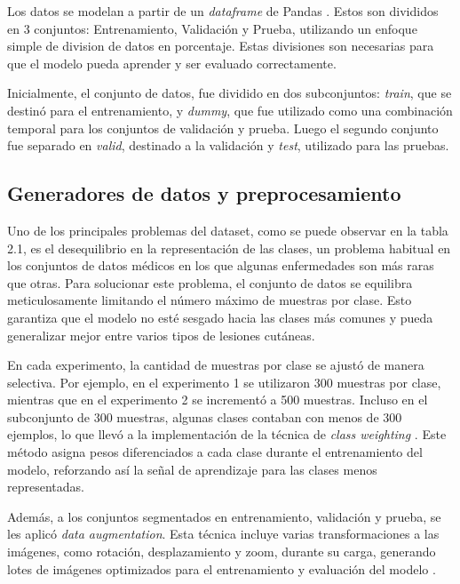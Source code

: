 Los datos se modelan a partir de un \textit{dataframe} de Pandas . Estos son divididos en 3 conjuntos: Entrenamiento, Validación y Prueba, utilizando un enfoque simple de division de datos en porcentaje. Estas divisiones son necesarias para que el modelo pueda aprender y ser evaluado correctamente.

Inicialmente, el conjunto de datos, fue dividido en dos subconjuntos: \textit{train}, que se destinó para el entrenamiento, y \textit{dummy}, que fue utilizado como una combinación temporal para los conjuntos de validación y prueba. Luego el segundo conjunto fue separado en \textit{valid}, destinado a la validación y \textit{test}, utilizado para las pruebas.

\subsection{Generadores de datos y preprocesamiento}

Uno de los principales problemas del dataset, como se puede observar en la tabla 2.1, es el desequilibrio en la representación de las clases, un problema habitual en los conjuntos de datos médicos en los que algunas enfermedades son más raras que otras. Para solucionar este problema, el conjunto de datos se equilibra meticulosamente limitando el número máximo de muestras por clase. Esto garantiza que el modelo no esté sesgado hacia las clases más comunes y pueda generalizar mejor entre varios tipos de lesiones cutáneas. 

En cada experimento, la cantidad de muestras por clase se ajustó de manera selectiva. Por ejemplo, en el experimento 1 se utilizaron 300 muestras por clase, mientras que en el experimento 2 se incrementó a 500 muestras. Incluso en el subconjunto de 300 muestras, algunas clases contaban con menos de 300 ejemplos, lo que llevó a la implementación de la técnica de \textit{class weighting} . Este método asigna pesos diferenciados a cada clase durante el entrenamiento del modelo, reforzando así la señal de aprendizaje para las clases menos representadas.

Además, a los conjuntos segmentados en entrenamiento, validación y prueba, se les aplicó \textit{data augmentation}. Esta técnica incluye varias transformaciones a las imágenes, como rotación, desplazamiento y zoom, durante su carga, generando lotes de imágenes optimizados para el entrenamiento y evaluación del modelo .

